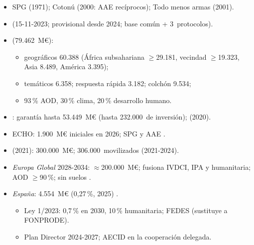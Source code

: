 \documentclass{article}
\begin{document}
\begin{columnas}
\begin{itemize}
\item SPG (1971); Cotonú (2000: AAE recíprocos); Todo menos armas (2001).
\item {} (15-11-2023; provisional desde 2024; base común + 3~protocolos).
\end{itemize}
\begin{itemize}
\item {} (79.462~M€):
  \begin{itemize}
  \item geográficos 60.388 (África subsahariana $\geq$29.181, vecindad $\geq$19.323, Asia 8.489, América 3.395);
  \item temáticos 6.358; respuesta rápida 3.182; colchón 9.534;
  \item 93\,\% AOD, 30\,\% clima, 20\,\% desarrollo humano.
  \end{itemize}
\item {}: garantía hasta 53.449~M€ (hasta 232.000~de inversión);  (2020).
\item ECHO: 1.900~M€ iniciales en 2026; SPG y AAE .
\item {} (2021): 300.000~M€; 306.000~movilizados (2021-2024).
\end{itemize}
\begin{itemize}
\item \emph{Europa Global} 2028-2034: $\approx$200.000~M€; fusiona IVDCI, IPA y humanitaria; AOD $\geq$90\,\%; sin suelos .
\item \emph{España}: 4.554~M€ (0,27\,\%, 2025) .
  \begin{itemize}
  \item Ley 1/2023: 0,7\,\% en 2030, 10\,\% humanitaria; FEDES (sustituye a FONPRODE).
  \item Plan Director 2024-2027; AECID en la cooperación delegada.
  \end{itemize}
\end{itemize}


\end{columnas}
\end{document}

